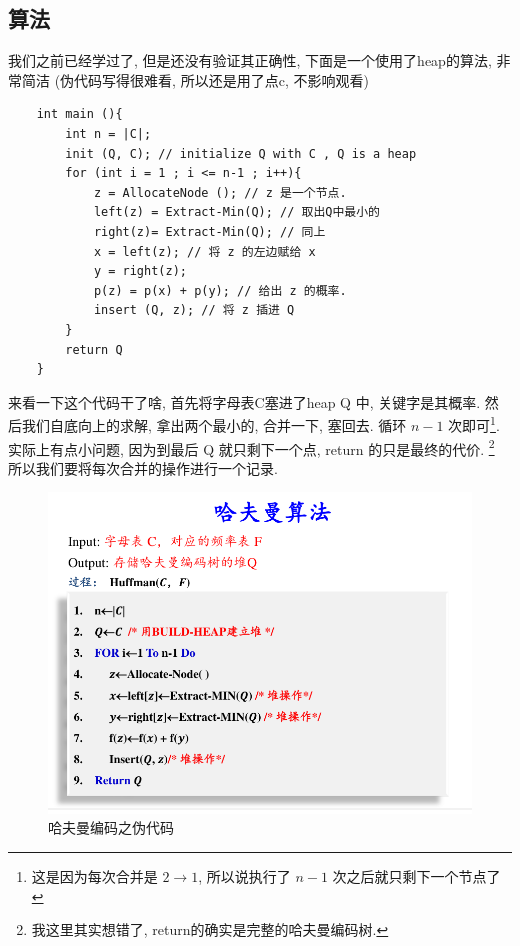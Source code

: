 \documentclass[a4paper, 10pt]{ctexart} %
\begin{document}
\subsection{算法}
我们之前已经学过了, 但是还没有验证其正确性, 下面是一个使用了heap的算法, 非常简洁 (伪代码写得很难看, 所以还是用了点c, 不影响观看)
    \begin{verbatim}
    int main (){
        int n = |C|;
        init (Q, C); // initialize Q with C , Q is a heap
        for (int i = 1 ; i <= n-1 ; i++){
            z = AllocateNode (); // z 是一个节点. 
            left(z) = Extract-Min(Q); // 取出Q中最小的
            right(z)= Extract-Min(Q); // 同上
            x = left(z); // 将 z 的左边赋给 x
            y = right(z);
            p(z) = p(x) + p(y); // 给出 z 的概率. 
            insert (Q, z); // 将 z 插进 Q
        }
        return Q
    }
    \end{verbatim}
来看一下这个代码干了啥, 首先将字母表C塞进了heap Q 中, 关键字是其概率.
然后我们自底向上的求解, 拿出两个最小的, 合并一下, 塞回去. 循环 $n-1$ 次即可\footnote{这是因为每次合并是 $2 \to 1$, 所以说执行了 $n-1$ 次之后就只剩下一个节点了}. 实际上有点小问题, 因为到最后 Q 就只剩下一个点, return 的只是最终的代价. \footnote{我这里其实想错了, return的确实是完整的哈夫曼编码树.}
所以我们要将每次合并的操作进行一个记录.
\begin{figure}[H]
    \centering
    \includegraphics[scale = 0.5]{1.png}
    \caption[]{哈夫曼编码之伪代码}
\end{figure}
\end{document}
